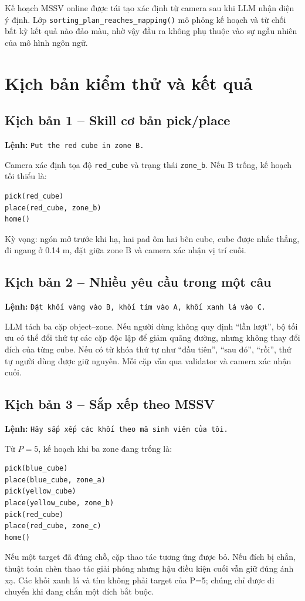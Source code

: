 \documentclass[a4paper,12pt]{article}
\newcommand{\code}[1]{\texttt{#1}}
\begin{document}
Kế hoạch MSSV online được tái tạo xác định từ camera sau khi LLM nhận diện ý
định. Lớp \code{sorting\_plan\_reaches\_mapping()} mô phỏng kế hoạch và từ chối
bất kỳ kết quả nào đảo màu, nhờ vậy đầu ra không phụ thuộc vào sự ngẫu nhiên của
mô hình ngôn ngữ.

\section{Kịch bản kiểm thử và kết quả}

\subsection{Kịch bản 1 -- Skill cơ bản pick/place}
\textbf{Lệnh:} \code{Put the red cube in zone B.}

Camera xác định tọa độ \code{red\_cube} và trạng thái \code{zone\_b}. Nếu B
trống, kế hoạch tối thiểu là:
\begin{lstlisting}[caption={Kịch bản gắp đặt cơ bản}]
pick(red_cube)
place(red_cube, zone_b)
home()
\end{lstlisting}
Kỳ vọng: ngón mở trước khi hạ, hai pad ôm hai bên cube, cube được nhấc thẳng,
đi ngang ở 0.14 m, đặt giữa zone B và camera xác nhận vị trí cuối.

\subsection{Kịch bản 2 -- Nhiều yêu cầu trong một câu}
\textbf{Lệnh:} \code{Đặt khối vàng vào B, khối tím vào A, khối xanh lá vào C.}

LLM tách ba cặp object--zone. Nếu người dùng không quy định ``lần lượt'', bộ
tối ưu có thể đổi thứ tự các cặp độc lập để giảm quãng đường, nhưng không thay
đổi đích của từng cube. Nếu có từ khóa thứ tự như ``đầu tiên'', ``sau đó'',
``rồi'', thứ tự người dùng được giữ nguyên. Mỗi cặp vẫn qua validator và camera
xác nhận cuối.

\subsection{Kịch bản 3 -- Sắp xếp theo MSSV}
\textbf{Lệnh:} \code{Hãy sắp xếp các khối theo mã sinh viên của tôi.}

Từ $P=5$, kế hoạch khi ba zone đang trống là:
\begin{lstlisting}[caption={Kế hoạch xác định theo MSSV 23020723}]
pick(blue_cube)
place(blue_cube, zone_a)
pick(yellow_cube)
place(yellow_cube, zone_b)
pick(red_cube)
place(red_cube, zone_c)
home()
\end{lstlisting}
Nếu một target đã đúng chỗ, cặp thao tác tương ứng được bỏ. Nếu đích bị chắn,
thuật toán chèn thao tác giải phóng nhưng hậu điều kiện cuối vẫn giữ đúng ánh xạ.
Các khối xanh lá và tím không phải target của P=5; chúng chỉ được di chuyển khi
đang chắn một đích bắt buộc.
\end{document}
